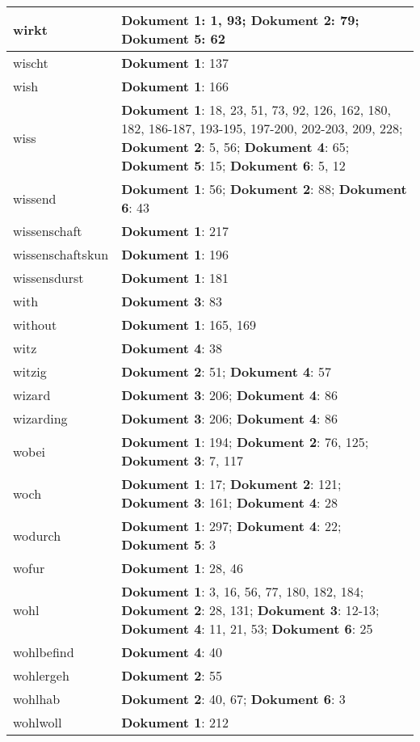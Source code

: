 \documentclass[a5paper]{article}
\begin{document}
\begin{longtable}[l]{|l|p{3in}|}
\hline
wirkt & \textbf{Dokument 1}: 1, 93; \textbf{Dokument 2}: 79; \textbf{Dokument 5}: 62 \\
\hline
wischt & \textbf{Dokument 1}: 137 \\
\hline
wish & \textbf{Dokument 1}: 166 \\
\hline
wiss & \textbf{Dokument 1}: 18, 23, 51, 73, 92, 126, 162, 180, 182, 186-187, 193-195, 197-200, 202-203, 209, 228; \textbf{Dokument 2}: 5, 56; \textbf{Dokument 4}: 65; \textbf{Dokument 5}: 15; \textbf{Dokument 6}: 5, 12 \\
\hline
wissend & \textbf{Dokument 1}: 56; \textbf{Dokument 2}: 88; \textbf{Dokument 6}: 43 \\
\hline
wissenschaft & \textbf{Dokument 1}: 217 \\
\hline
wissenschaftskun & \textbf{Dokument 1}: 196 \\
\hline
wissensdurst & \textbf{Dokument 1}: 181 \\
\hline
with & \textbf{Dokument 3}: 83 \\
\hline
without & \textbf{Dokument 1}: 165, 169 \\
\hline
witz & \textbf{Dokument 4}: 38 \\
\hline
witzig & \textbf{Dokument 2}: 51; \textbf{Dokument 4}: 57 \\
\hline
wizard & \textbf{Dokument 3}: 206; \textbf{Dokument 4}: 86 \\
\hline
wizarding & \textbf{Dokument 3}: 206; \textbf{Dokument 4}: 86 \\
\hline
wobei & \textbf{Dokument 1}: 194; \textbf{Dokument 2}: 76, 125; \textbf{Dokument 3}: 7, 117 \\
\hline
woch & \textbf{Dokument 1}: 17; \textbf{Dokument 2}: 121; \textbf{Dokument 3}: 161; \textbf{Dokument 4}: 28 \\
\hline
wodurch & \textbf{Dokument 1}: 297; \textbf{Dokument 4}: 22; \textbf{Dokument 5}: 3 \\
\hline
wofur & \textbf{Dokument 1}: 28, 46 \\
\hline
wohl & \textbf{Dokument 1}: 3, 16, 56, 77, 180, 182, 184; \textbf{Dokument 2}: 28, 131; \textbf{Dokument 3}: 12-13; \textbf{Dokument 4}: 11, 21, 53; \textbf{Dokument 6}: 25 \\
\hline
wohlbefind & \textbf{Dokument 4}: 40 \\
\hline
wohlergeh & \textbf{Dokument 2}: 55 \\
\hline
wohlhab & \textbf{Dokument 2}: 40, 67; \textbf{Dokument 6}: 3 \\
\hline
wohlwoll & \textbf{Dokument 1}: 212 \\

\end{longtable}
\end{document}
